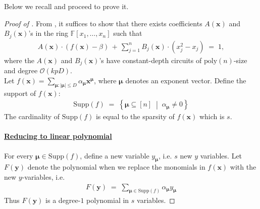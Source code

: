 \documentclass[11pt]{article}
\newcommand{\bigO}{\mathcal{O}}
\newcommand{\setcond}[2]{\left\{ #1 \;\middle\vert\; #2 \right\}}
\newcommand{\F}{\mathbb{F}}
\begin{document}
\noindent
Below we recall  and proceed to prove it.

\ubdnonmlposchar*

\begin{proof}[Proof of ]
From , it suffices to show that there exists coefficients $A(\mathbf{x})$ and $B_{j}(\mathbf{x})$'s in the ring $\F[x_{1},\ldots,x_{n}]$ such that
\begin{align*}
    A(\mathbf{x}) \cdot (f(\mathbf{x})-\beta) \, + \, \sum_{j=1}^{n} B_{j}(\mathbf{x}) \cdot (x_{j}^{2} - x_{j}) \; = \; 1,
\end{align*}
where the $A(\mathbf{x})$ and $B_{j}(\mathbf{x})$'s have constant-depth circuits of $\mathrm{poly}(n)$-size and degree $\bigO(kpD)$.\\

\noindent
Let $f(\mathbf{x}) = \sum_{\bm{\mu} : |\bm{\mu}| \leq D} \alpha_{\bm{\mu}} \mathbf{x}^{\bm{\mu}}$, where $\bm{\mu}$ denotes an exponent vector. Define the support of $f(\mathbf{x})$:
\begin{align*}
    \mathrm{Supp}(f) \; = \; \setcond{\bm{\mu} \subseteq [n]}{\alpha_{\bm{\mu}} \neq 0}
\end{align*}
The cardinality of $\mathrm{Supp}(f)$ is equal to the sparsity of $f(\mathbf{x})$ which is $s$.

\paragraph{\underline{Reducing to linear polynomial}}For every $\bm{\mu} \in \mathrm{Supp}(f)$, define a new variable $y_{\bm{\mu}}$, i.e. $s$ new $y$ variables. Let $F(\mathbf{y})$ denote the polynomial when we replace the monomials in $f(\mathbf{x})$ with the new $y$-variables, i.e.
\begin{align*}
    F(\mathbf{y}) \; = \; \sum_{\bm{\mu} \in \mathrm{Supp}(f)} \alpha_{\bm{\mu}} y_{\bm{\mu}}
\end{align*}
Thus $F(\mathbf{y})$ is a degree-$1$ polynomial in $s$ variables.


\end{proof}
\end{document}
